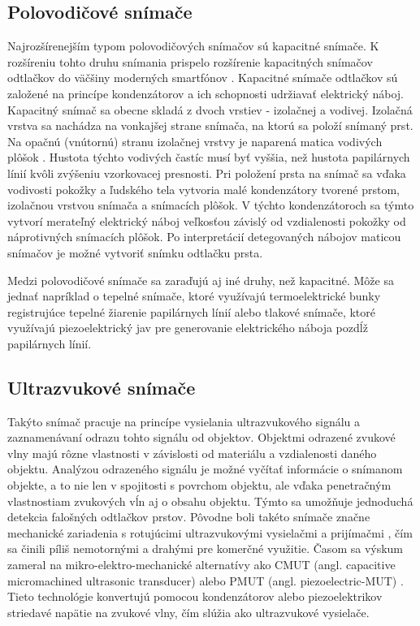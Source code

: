   \subsection{Polovodičové snímače}
  Najrozšírenejším typom polovodičových snímačov sú kapacitné snímače. K rozšíreniu tohto druhu snímania prispelo rozšírenie kapacitných snímačov odtlačkov
  do väčšiny moderných smartfónov \cite{smartphone_sensors}. Kapacitné snímače odtlačkov sú založené na princípe kondenzátorov a ich schopnosti udržiavať
  elektrický náboj. Kapacitný snímač sa obecne skladá z dvoch vrstiev - izolačnej a vodivej. Izolačná vrstva sa nachádza na vonkajšej strane
  snímača, na ktorú sa položí snímaný prst. Na opačnú (vnútornú) stranu izolačnej vrstvy je naparená matica vodivých plôšok \cite{Drahansky}. Hustota týchto
  vodivých častíc musí byť vyššia, než hustota papilárnych línií kvôli zvýšeniu vzorkovacej presnosti. Pri položení prsta na snímač sa vďaka vodivosti
  pokožky a ľudského tela vytvoria malé kondenzátory tvorené prstom, izolačnou vrstvou snímača a snímacích plôšok. V týchto kondenzátoroch sa týmto vytvorí
  merateľný elektrický náboj veľkosťou závislý od vzdialenosti pokožky od náprotivných snímacích plôšok. Po interpretácií detegovaných nábojov maticou
  snímačov je možné vytvoriť snímku odtlačku prsta.

  Medzi polovodičové snímače sa zaraďujú aj iné druhy, než kapacitné. Môže sa jednať napríklad o tepelné snímače, ktoré využívajú termoelektrické bunky
  registrujúce tepelné žiarenie papilárnych línií alebo tlakové snímače, ktoré využívajú piezoelektrický jav pre generovanie elektrického náboja
  pozdĺž papilárnych línií.

  \subsection{Ultrazvukové snímače}
  Takýto snímač pracuje na princípe vysielania ultrazvukového signálu a zaznamenávaní odrazu tohto signálu od objektov. Objektmi odrazené zvukové vlny
  majú rôzne vlastnosti v závislosti od materiálu a vzdialenosti daného objektu. Analýzou odrazeného signálu je možné vyčítať informácie o snímanom objekte,
  a to nie len v spojitosti s povrchom objektu, ale vďaka penetračným vlastnostiam zvukových vĺn aj o obsahu objektu. Týmto sa umožňuje jednoduchá detekcia
  falošných odtlačkov prstov. Pôvodne boli takéto snímače značne mechanické zariadenia s rotujúcimi ultrazvukovými vysielačmi a prijímačmi \cite{Drahansky},
  čím sa činili píliš nemotornými a drahými pre komerčné využitie. Časom sa výskum zameral na mikro-elektro-mechanické alternatívy ako
  CMUT (angl. capacitive micromachined ultrasonic transducer) \cite{savoia2010cmut} alebo PMUT (angl. piezoelectric-MUT) \cite{tang2015pmut}. Tieto technológie
  konvertujú pomocou kondenzátorov alebo piezoelektrikov striedavé napätie na zvukové vlny, čím slúžia ako ultrazvukové vysielače.

